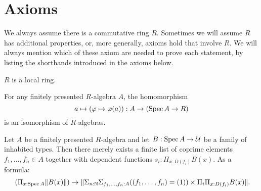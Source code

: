 \documentclass{zariski}
\begin{document}
\tableofcontents

\section{Axioms}

We always assume there is a commutative ring $R$.
Sometimes we will assume $R$ has additional properties, or, more generally,
axioms hold that involve $R$.
We will always mention which of these axiom are needed to prove each statement,
by listing the shorthands introduced in the axioms below.

\begin{axiom}[Loc]%
  \label{loc}
  $R$ is a local ring.
\end{axiom}

\begin{axiom}[SQC]%
  \label{sqc}
  For any finitely presented $R$-algebra $A$, the homomorphism
  \[ a \mapsto (\varphi\mapsto \varphi(a)) : A \to (\operatorname{Spec} A \to R)\]
  is an isomorphism of $R$-algebras.
\end{axiom}

\begin{axiom}[Z-choice]%
  \label{Z-choice}
  Let $A$ be a finitely presented $R$-algebra
  and let $B : \operatorname{Spec} A \to \mathcal{U}$ be a family of inhabited types.
  Then there merely exists
  a finite list of coprime elements $f_1, \dots, f_n \in A$
  together with dependent functions $s_i : \Pi_{x : D(f_i)} B(x)$.
  As a formula:
  \[ (\Pi_{x : \Spec A} \propTrunc{B(x)}) \to
     \propTrunc{ \Sigma_{n : \N} \Sigma_{f_1, \dots, f_n : A}
      ((f_1, \dots, f_n) = (1)) \times
      \Pi_i \Pi_{x : D(f_i)} B(x) }
     \rlap{.}
  \]
\end{axiom}

\end{document}
